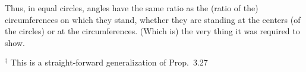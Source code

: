 \begin{Parallel}{}{}
{Thus, in equal circles,  angles have the same ratio
as the (ratio of the) circumferences on which they stand, whether they are standing at
the centers (of the circles) or at the circumferences. (Which is) the very thing it was required to show.}
\end{Parallel}
{\footnotesize\noindent$^\dag$ This is a straight-forward generalization of Prop.~3.27}
